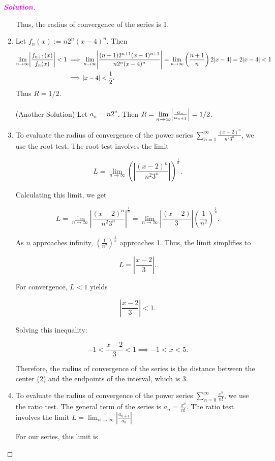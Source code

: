 \documentclass[12pt,openany]{book}
\theoremstyle{definition}
\newcommand{\of}[1]{\left( #1 \right)}
\newcommand{\sol}{\textcolor{magenta}{\bf Solution}}
\begin{document}
\begin{proof}[\sol]
\begin{enumerate}[1.]
			Thus, the radius of convergence of the series is 1.
			\item Let $
			f_n(x):=n2^n(x-4)^n.
			$ Then \begin{align*}
				\lim\limits_{n\to\infty}\abs{\frac{f_{n+1}(x)}{f_n(x)}}<1&\implies
				\lim\limits_{n\to\infty}\abs{\frac{(n+1)2^{n+1}(x-4)^{n+1}}{n2^n(x-4)^n}}=
				\lim\limits_{n\to\infty}\of{\frac{n+1}{n}}2\abs{x-4}=2\abs{x-4}<1\\
				&\implies\abs{x-4}<\frac{1}{2}.
			\end{align*} Thus $R=1/2$.
			\\ \ \\
			(Another Solution) Let $a_n=n2^n$. Then $R=\lim\limits_{n\to\infty}\abs{\frac{a_n}{a_{n+1}}}=1/2$.
			\item To evaluate the radius of convergence of the power series \(\sum_{n=1}^{\infty} \frac{(x-2)^n}{n^2 3^n}\), we use the root test. The root test involves the limit
			
			\[ L = \lim_{n \to \infty} \left( \left| \frac{(x-2)^n}{n^2 3^n} \right| \right)^{\frac{1}{n}}. \]
			
			Calculating this limit, we get
			
			\[ L = \lim_{n \to \infty} \left| \frac{(x-2)^n}{n^2 3^n} \right|^{\frac{1}{n}}  = \lim_{n \to \infty} \left| \frac{(x-2)}{3} \right| \left( \frac{1}{n^2} \right)^{\frac{1}{n}}. \]
			
			As \(n\) approaches infinity, \(\left( \frac{1}{n^2} \right)^{\frac{1}{n}}\) approaches 1. Thus, the limit simplifies to
			
			\[ L = \left| \frac{x-2}{3} \right|. \]
			
			For convergence, \( L < 1 \) yields
			
			\[ \left| \frac{x-2}{3} \right| < 1. \]
			
			Solving this inequality:
			
			\[ -1 < \frac{x-2}{3} < 1\implies  -1 < x < 5. \]
			
			Therefore, the radius of convergence of the series is the distance between the center (2) and the endpoints of the interval, which is 3.
			\item To evaluate the radius of convergence of the power series \(\sum_{n=0}^{\infty} \frac{x^n}{n!}\), we use the ratio test. The general term of the series is \(a_n = \frac{x^n}{n!}\). The ratio test involves the limit
			$L = \lim_{n \to \infty} \left| \frac{a_{n+1}}{a_n} \right| $
			
			For our series, this limit is
			

\end{enumerate}
\end{proof}
\end{document}
